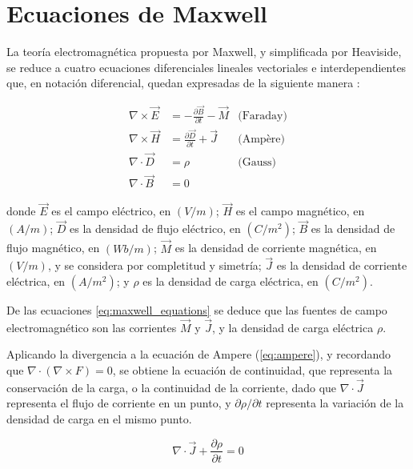 \section{Ecuaciones de Maxwell}
\label{subsec_ecuaciones_maxwell}
La teoría electromagnética propuesta por Maxwell, y simplificada por Heaviside, se reduce a cuatro ecuaciones diferenciales lineales vectoriales e interdependientes que, en notación diferencial, quedan expresadas de la siguiente manera \cite{Pozar:MwEngineering}:

\begin{subequations}
	\label{eq:maxwell_equations}
	\begin{align}	
		\nabla \times \vec{E} & = -\frac{\partial \vec{B}}{\partial t} - \vec{M}  & \text{(Faraday)}\\
		\nabla \times \vec{H} & = \frac{\partial \vec{D}}{\partial t} + \vec{J} & \text{(Ampère)} \label{eq:ampere} \\
		\nabla \cdot \vec{D} & = \rho & \text{(Gauss)} \\
		\nabla \cdot \vec{B} & = 0
	\end{align}
\end{subequations}


donde $\vec{E}$ es el campo eléctrico, en $(V/m)$; $\vec{H}$ es el campo magnético, en $(A/m)$; $\vec{D}$ es la densidad de flujo eléctrico, en $(C/m^2)$; $\vec{B}$ es la densidad de flujo magnético, en $(Wb/m)$; $\vec{M}$ es la densidad de corriente magnética, en $(V/m)$, y se considera por completitud y simetría; $\vec{J}$ es la densidad de corriente eléctrica, en $(A/m^2)$; y $\rho$ es la densidad de carga eléctrica, en $(C/m^2)$.

De las ecuaciones \ref{eq:maxwell_equations} se deduce que las fuentes de campo electromagnético son las corrientes $\vec{M}$ y $\vec{J}$, y la densidad de carga eléctrica $\rho$.

Aplicando la divergencia a la ecuación de Ampere (\ref{eq:ampere}), y recordando que $\nabla \cdot (\nabla \times F) = 0$, se obtiene la ecuación de continuidad, que representa la conservación de la carga, o la continuidad de la corriente, dado que $\nabla \cdot \vec{J}$ representa el flujo de corriente en un punto, y $\partial \rho / \partial t$ representa la variación de la densidad de carga en el mismo punto.

\begin{equation}
	\label{eq:continuidad}
	\nabla \cdot \vec{J} + \frac{\partial \rho}{\partial t} = 0
\end{equation}

